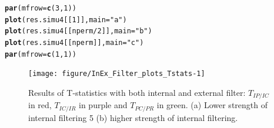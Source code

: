 \documentclass[12pt]{article}\usepackage[]{graphicx}\usepackage[]{color}
\makeatletter
\newcommand{\hlnum}[1]{\textcolor[rgb]{0.686,0.059,0.569}{#1}}%
\newcommand{\hlstr}[1]{\textcolor[rgb]{0.192,0.494,0.8}{#1}}%
\newcommand{\hlopt}[1]{\textcolor[rgb]{0,0,0}{#1}}%
\newcommand{\hlstd}[1]{\textcolor[rgb]{0.345,0.345,0.345}{#1}}%
\newcommand{\hlkwc}[1]{\textcolor[rgb]{0.333,0.667,0.333}{#1}}%
\newcommand{\hlkwd}[1]{\textcolor[rgb]{0.737,0.353,0.396}{\textbf{#1}}}%
\newenvironment{kframe}{%
 \def\at@end@of@kframe{}%
 \ifinner\ifhmode%
  \def\at@end@of@kframe{\end{minipage}}%
  \begin{minipage}{\columnwidth}%
 \fi\fi%
 \def\FrameCommand##1{\hskip\@totalleftmargin \hskip-\fboxsep
 \colorbox{shadecolor}{##1}\hskip-\fboxsep
     \hskip-\linewidth \hskip-\@totalleftmargin \hskip\columnwidth}%
 \MakeFramed {\advance\hsize-\width
   \@totalleftmargin\z@ \linewidth\hsize
   \@setminipage}}%
 {\par\unskip\endMakeFramed%
 \at@end@of@kframe}
\newenvironment{knitrout}{}{} %
\makeatother
\begin{document}
\begin{knitrout}\small
{}\color{fgcolor}\begin{kframe}
\begin{alltt}
\hlkwd{par}\hlstd{(}\hlkwc{mfrow}\hlstd{=}\hlkwd{c}\hlstd{(}\hlnum{3}\hlstd{,} \hlnum{1}\hlstd{))}
\hlkwd{plot}\hlstd{(res.simu4[[}\hlnum{1}\hlstd{]],} \hlkwc{main} \hlstd{=} \hlstr{"a"}\hlstd{)}
\hlkwd{plot}\hlstd{(res.simu4[[nperm}\hlopt{/}\hlnum{2}\hlstd{]],} \hlkwc{main} \hlstd{=} \hlstr{"b"}\hlstd{)}
\hlkwd{plot}\hlstd{(res.simu4[[nperm]],} \hlkwc{main} \hlstd{=} \hlstr{"c"}\hlstd{)}
\hlkwd{par}\hlstd{(}\hlkwc{mfrow}\hlstd{=}\hlkwd{c}\hlstd{(}\hlnum{1}\hlstd{,} \hlnum{1}\hlstd{))}
\end{alltt}
\end{kframe}\begin{figure}

{\centering \texttt{[image: figure/InEx\_Filter\_plots\_Tstats-1]} 

}

\caption[Results of T-statistics with both internal and external filter]{Results of T-statistics with both internal and external filter: $T_{IP/IC}$ in red, $T_{IC/IR}$ in purple and $T_{PC/PR}$ in green. (a) Lower strength of internal filtering 5 (b) higher strength of internal filtering.\label{fig:InEx_Filter_plots_Tstats}}
\end{figure}


\end{knitrout}
  
\end{document}

